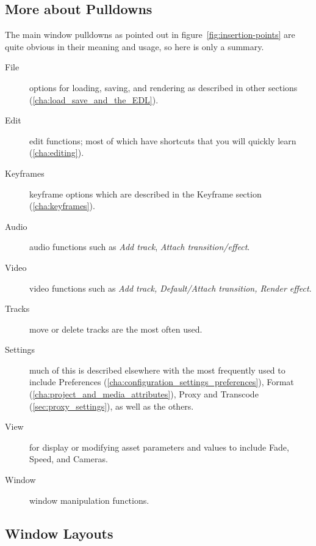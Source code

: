 \subsection{More about Pulldowns}%
\label{sub:more_about_pulldowns}

The main window pulldowns as pointed out in figure~\ref{fig:insertion-points} are quite obvious in their meaning and usage, so here is only a summary.  



\begin{description}
    \item[File]  options for loading, saving, and rendering as described in other sections (\ref{cha:load_save_and_the_EDL}).
    \item[Edit]  edit functions; most of which have shortcuts that you will quickly learn (\ref{cha:editing}).
    \item[Keyframes]  keyframe options which are described in the Keyframe section (\ref{cha:keyframes}).
    \item[Audio]  audio functions such as \textit{Add track}, \textit{Attach transition/effect}.
    \item[Video]  video functions such as \textit{Add track, Default/Attach transition, Render effect}.
    \item[Tracks]  move or delete tracks are the most often used.
    \item[Settings]  much of this is described elsewhere with the most frequently used to include
Preferences (\ref{cha:configuration_settings_preferences}), Format (\ref{cha:project_and_media_attributes}), 
Proxy and Transcode (\ref{sec:proxy_settings}), as well as the others.
    \item[View]  for display or modifying asset parameters and values to include Fade, Speed, and Cameras.
    \item[Window]  window manipulation functions.
\end{description}


\subsection{Window Layouts}%
\label{sub:window_layouts}

